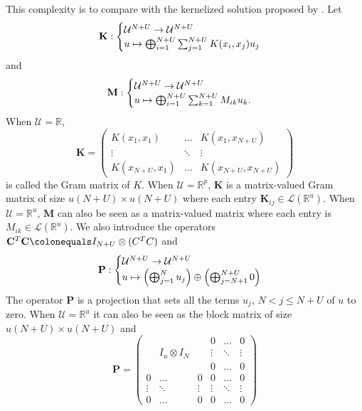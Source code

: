 This complexity is to compare with the kernelized solution proposed by \citet{minh2016unifying}. Let
\begin{dmath*}
\mathbf{K}:\begin{cases}
\mathcal{U}^{N+U} \to \mathcal{U}^{N+U} \\
u\mapsto\Vect_{i=1}^{N+U}\sum_{j=1}^{N+U}K(x_i, x_j)u_j
\end{cases}
\end{dmath*}
and
\begin{dmath*}
\mathbf{M}:\begin{cases}
\mathcal{U}^{N+U} \to \mathcal{U}^{N+U} \\
u\mapsto\Vect_{i=1}^{N+U}\sum_{k=1}^{N+U}M_{ik}u_k.
\end{cases}
\end{dmath*}
When $\mathcal{U}=\mathbb{R}$,
\begin{dmath*}
    \mathbf{K}=\begin{pmatrix} K(x_1, x_1) & \hdots & K(x_1, x_{N+U})
    \\ \vdots & \ddots & \vdots \\  K(x_{N+U}, x_1) & \hdots & K(x_{N+U}, x_{N+U}) \end{pmatrix}
\end{dmath*}
is called the Gram matrix of $K$. When $\mathcal{U}=\mathbb{R}^p$, $\mathbf{K}$ is a matrix-valued Gram matrix of size $u(N+U)\times u(N+U)$ where each entry $\mathbf{K}_{ij}\in\mathcal{L}(\mathbb{R}^u)$. When $\mathcal{U}=\mathbb{R}^u$, $\mathbf{M}$ can also be seen as a matrix-valued matrix where each entry is $M_{ik}\in\mathcal{L}(\mathbb{R}^u)$. We also introduce the operators $\mathbf{C}^T \mathbf{C}\colonequals I_{N+U} \otimes (C^T C)$ and
\begin{dmath*}
\mathbf{P}:\begin{cases}
\mathcal{U}^{N+U} \to \mathcal{U}^{N+U} \\
u\mapsto \left(\Vect_{j=1}^Nu_j\right) \oplus \left(\Vect_{j=N+1}^{N+U}0\right)
\end{cases}
\end{dmath*}
The operator $\mathbf{P}$ is a projection that sets all the terms $u_j$, $N < j \le N + U$ of $u$ to zero. When $\mathcal{U}=\mathbb{R}^u$ it can also be seen as the block matrix of size $u(N+U) \times u(N + U)$ and
\begin{dmath*}
    \mathbf{P}=\begin{pmatrix}  & & & 0 & \hdots & 0 \\ & I_u \otimes I_{N} & & \vdots & \ddots & \vdots \\ & & & 0 & \hdots & 0 \\
    0 & \hdots & 0 & 0 & \hdots & 0 \\
    \vdots & \ddots & \vdots & \vdots & \ddots & \vdots \\
    0 & \hdots & 0 & 0 & \hdots & 0
    \end{pmatrix}
\end{dmath*}

